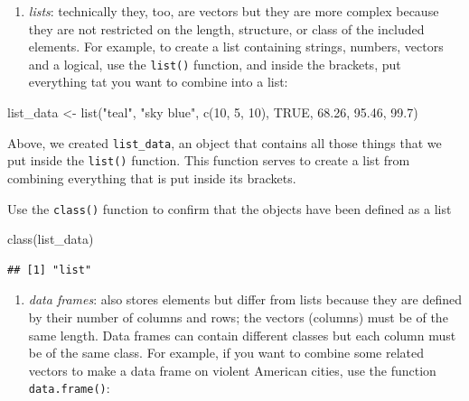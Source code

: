 \documentclass[
]{book}
\newenvironment{Shaded}{\begin{snugshade}}{\end{snugshade}}
\newcommand{\ConstantTok}[1]{\textcolor[rgb]{0.00,0.00,0.00}{#1}}
\newcommand{\DecValTok}[1]{\textcolor[rgb]{0.00,0.00,0.81}{#1}}
\newcommand{\FloatTok}[1]{\textcolor[rgb]{0.00,0.00,0.81}{#1}}
\newcommand{\FunctionTok}[1]{\textcolor[rgb]{0.00,0.00,0.00}{#1}}
\newcommand{\NormalTok}[1]{#1}
\newcommand{\OtherTok}[1]{\textcolor[rgb]{0.56,0.35,0.01}{#1}}
\newcommand{\StringTok}[1]{\textcolor[rgb]{0.31,0.60,0.02}{#1}}
\providecommand{\tightlist}{%
  \setlength{\itemsep}{0pt}\setlength{\parskip}{0pt}}
\begin{document}
\begin{enumerate}
\def\labelenumi{\arabic{enumi}.}
\setcounter{enumi}{1}
\tightlist
\item
  \emph{lists}: technically they, too, are vectors but they are more complex because they are not restricted on the length, structure, or class of the included elements. For example, to create a list containing strings, numbers, vectors and a logical, use the \texttt{list()} function, and inside the brackets, put everything tat you want to combine into a list:
\end{enumerate}

\begin{Shaded}
\begin{Highlighting}[]
\NormalTok{list\_data }\OtherTok{\textless{}{-}} \FunctionTok{list}\NormalTok{(}\StringTok{"teal"}\NormalTok{, }\StringTok{"sky blue"}\NormalTok{, }\FunctionTok{c}\NormalTok{(}\DecValTok{10}\NormalTok{, }\DecValTok{5}\NormalTok{, }\DecValTok{10}\NormalTok{), }\ConstantTok{TRUE}\NormalTok{, }\FloatTok{68.26}\NormalTok{, }\FloatTok{95.46}\NormalTok{, }\FloatTok{99.7}\NormalTok{) }
\end{Highlighting}
\end{Shaded}

Above, we created \texttt{list\_data}, an object that contains all those things that we put inside the \texttt{list()} function. This function serves to create a list from combining everything that is put inside its brackets.

Use the \texttt{class()} function to confirm that the objects have been defined as a list

\begin{Shaded}
\begin{Highlighting}[]
\FunctionTok{class}\NormalTok{(list\_data)}
\end{Highlighting}
\end{Shaded}

\begin{verbatim}
## [1] "list"
\end{verbatim}

\begin{enumerate}
\def\labelenumi{\arabic{enumi}.}
\setcounter{enumi}{2}
\tightlist
\item
  \emph{data frames}: also stores elements but differ from lists because they are defined by their number of columns and rows; the vectors (columns) must be of the same length. Data frames can contain different classes but each column must be of the same class. For example, if you want to combine some related vectors to make a data frame on violent American cities, use the function \texttt{data.frame()}:
\end{enumerate}
\end{document}

